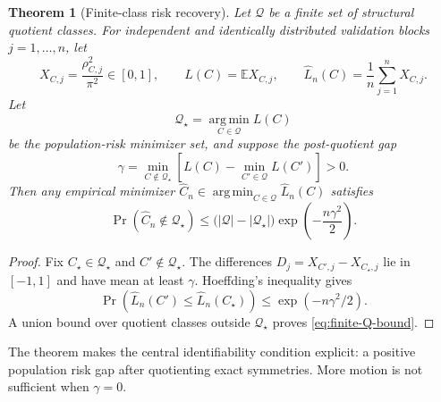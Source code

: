 \documentclass[11pt]{article}
\newtheorem{theorem}{Theorem}
\newcommand{\argmin}{\operatorname*{arg\,min}}
\newcommand{\abs}[1]{\left\lvert #1 \right\rvert}
\begin{document}
    \begin{theorem}[Finite-class risk recovery]
Let $\mathcal Q$ be a finite set of structural quotient classes. For independent and
identically distributed validation blocks $j=1,\ldots,n$, let
\begin{equation}
    X_{C,j}=\frac{\rho_{C,j}^2}{\pi^2}\in[0,1],
    \qquad
    L(C)=\mathbb E X_{C,j},
    \qquad
    \widehat L_n(C)=\frac1n\sum_{j=1}^{n}X_{C,j}.
\end{equation}
Let
\begin{equation}
    \mathcal Q_\star=\argmin_{C\in\mathcal Q}L(C)
\end{equation}
be the population-risk minimizer set, and suppose the post-quotient gap
\begin{equation}
    \gamma
    =\min_{C\notin\mathcal Q_\star}
    \left[L(C)-\min_{C'\in\mathcal Q}L(C')\right]
    >0.
\end{equation}
Then any empirical minimizer
$\widehat C_n\in\argmin_{C\in\mathcal Q}\widehat L_n(C)$ satisfies
\begin{equation}
    \Pr(\widehat C_n\notin\mathcal Q_\star)
    \le
    \bigl(\abs{\mathcal Q}-\abs{\mathcal Q_\star}\bigr)
    \exp\!\left(-\frac{n\gamma^2}{2}\right).
    \label{eq:finite-Q-bound}
\end{equation}
    \end{theorem}

    \begin{proof}
        Fix $C_\star\in\mathcal Q_\star$ and $C'\notin\mathcal Q_\star$. The differences
        $D_j=X_{C',j}-X_{C_\star,j}$ lie in $[-1,1]$ and have mean at least $\gamma$. Hoeffding's
        inequality \cite{hoeffding1963} gives
        \begin{equation}
            \Pr\!\left(\widehat L_n(C')\le\widehat L_n(C_\star)\right)
            \le\exp(-n\gamma^2/2).
        \end{equation}
        A union bound over quotient classes outside $\mathcal Q_\star$ proves
        \eqref{eq:finite-Q-bound}.
    \end{proof}

    The theorem makes the central identifiability condition explicit: a positive population
    risk gap after quotienting exact symmetries. More motion is not sufficient when
    $\gamma=0$.
\end{document}
